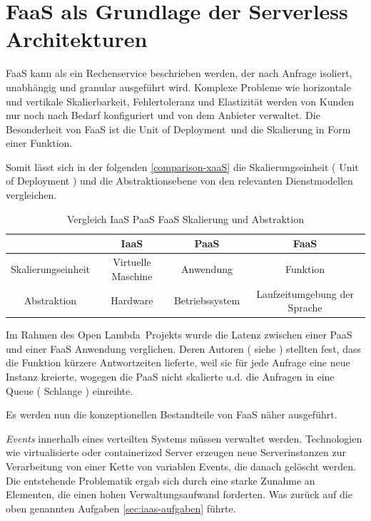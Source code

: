 \documentclass[
12pt,
english,
ngerman,
headsepline,
twoside,
openright,
numbers=noenddot,version=first
]{scrreprt}
\providecommand{\tabularnewline}{\\}
\begin{document}
\chapter{FaaS als Grundlage der Serverless Architekturen}%

\acrfull{FaaS}\label{sec:faas} kann als ein Rechenservice beschrieben werden, der nach Anfrage isoliert, unabhängig und granular ausgeführt wird. Komplexe Probleme wie horizontale und vertikale Skalierbarkeit, Fehlertoleranz und Elastizität werden von Kunden nur noch nach Bedarf konfiguriert und von dem Anbieter verwaltet. Die Besonderheit von \acrshort{FaaS} ist die \glqq Unit of Deployment\grqq\ und die Skalierung in Form einer Funktion. \cite{patternAWS}


Somit lässt sich in der folgenden \autoref{comparison-xaaS} die Skalierungseinheit ( Unit of Deployment ) und die Abstraktionsebene von den relevanten Dienstmodellen vergleichen. 
\begin{table}[H]
	\caption{Vergleich IaaS PaaS FaaS Skalierung und Abstraktion}	
	\centering{}
	\begin{tabular}{ c | c c c }
		\noalign{\vskip\doublerulesep}
		& IaaS & PaaS & FaaS 
		\tabularnewline[\doublerulesep]	\hline	
		\noalign{\vskip\doublerulesep}
		Skalierungseinheit & Virtuelle Maschine & Anwendung & Funktion \tabularnewline
		Abstraktion & Hardware & Betriebssystem & Laufzeitumgebung der Sprache
	\end{tabular}
\label{comparison-xaaS}
\end{table}

Im Rahmen des \glqq Open Lambda\grqq\ Projekts wurde die Latenz zwischen einer \acrshort{PaaS} und einer \acrshort{FaaS} Anwendung verglichen. Deren Autoren ( siehe \cite{lambdaOpen} ) stellten fest, dass die Funktion kürzere Antwortzeiten lieferte, weil sie für jede Anfrage eine neue Instanz kreierte, wogegen die \acrshort{PaaS} nicht skalierte u.d. die Anfragen in eine Queue ( Schlange ) einreihte. 

Es werden nun die konzeptionellen Bestandteile von \acrshort{FaaS} näher ausgeführt.

\textit{Events}\label{par:event-reaction} innerhalb eines verteilten Systems müssen verwaltet werden. Technologien wie virtualisierte oder containerized Server erzeugen neue Serverinstanzen zur Verarbeitung von einer Kette von variablen Events, die danach gelöscht werden.\cite{lambdaAWS} Die entstehende Problematik ergab sich durch eine starke Zunahme an Elementen, die einen hohen Verwaltungsaufwand forderten.  Was zurück auf die oben genannten Aufgaben \autoref{sec:iaas-aufgaben} führte.
\end{document}
